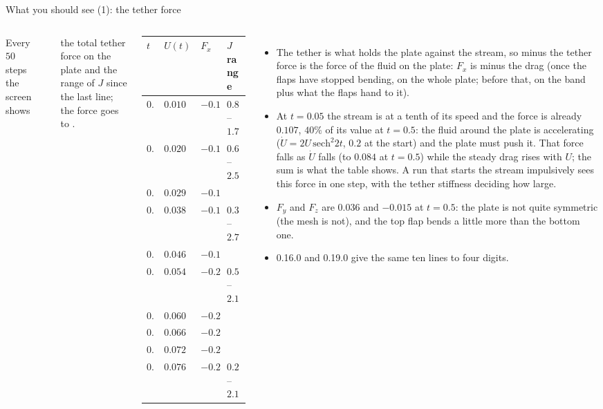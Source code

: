 \documentclass[aspectratio=169,11pt]{beamer}
\begin{document}
\begin{frame}{What you should see (1): the tether force}
\label{fr:force}
\scriptsize
\begin{columns}[T]
Every $50$ steps the screen shows
\begin{center}\tiny{}\end{center}
the total tether force on the plate and the range of $J$ since the last line; the force goes to .

\medskip
\begin{tabular}{@{}llll@{}}
\toprule
$t$ & $U(t)$ & $F_x$ & $J$ range \\
\midrule
$0.05$ & $0.010$ & $-0.107$ & $0.82$--$1.73$ \\
$0.10$ & $0.020$ & $-0.106$ & $0.66$--$2.51$ \\
$0.15$ & $0.029$ & $-0.150$ & \\
$0.20$ & $0.038$ & $-0.192$ & $0.35$--$2.72$ \\
$0.25$ & $0.046$ & $-0.194$ & \\
$0.30$ & $0.054$ & $-0.215$ & $0.52$--$2.14$ \\
$0.35$ & $0.060$ & $-0.221$ & \\
$0.40$ & $0.066$ & $-0.239$ & \\
$0.45$ & $0.072$ & $-0.263$ & \\
$0.50$ & $0.076$ & $-0.276$ & $0.21$--$2.10$ \\
\bottomrule
\end{tabular}
\begin{itemize}
  \item The tether is what holds the plate against the stream, so minus the tether force is the force of the fluid on the plate: $F_x$ is minus the drag (once the flaps have stopped bending, on the whole plate; before that, on the band plus what the flaps hand to it).
  \item {} At $t = 0.05$ the stream is at a tenth of its speed and the force is already $0.107$, $40\%$ of its value at $t = 0.5$: the fluid around the plate is accelerating ($\dot U = 2U\,\mathrm{sech}^2 2t$, $0.2$ at the start) and the plate must push it. That force falls as $\dot U$ falls (to $0.084$ at $t = 0.5$) while the steady drag rises with $U$; the sum is what the table shows. A run that starts the stream impulsively sees this force in one step, with the tether stiffness deciding how large.
  \item $F_y$ and $F_z$ are $0.036$ and $-0.015$ at $t = 0.5$: the plate is not quite symmetric (the mesh is not), and the top flap bends a little more than the bottom one.
  \item 0.16.0 and 0.19.0 give the same ten lines to four digits.
\end{itemize}
\end{columns}
\end{frame}
\end{document}
